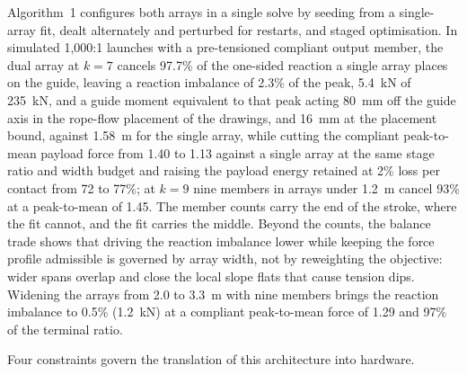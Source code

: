 \documentclass[preprint,12pt,number]{elsarticle}
\newcommand{\ptm}{peak-to-mean}
\begin{document}
Algorithm~1 configures both arrays in a single solve by seeding from a single-array fit, dealt alternately and perturbed for restarts, and staged optimisation. In simulated 1,000:1 launches with a pre-tensioned compliant output member, the dual array at $k=7$ cancels 97.7\% of the one-sided reaction a single array places on the guide, leaving a reaction imbalance of 2.3\% of the peak, 5.4~kN of 235~kN, and a guide moment equivalent to that peak acting 80~mm off the guide axis in the rope-flow placement of the drawings, and 16~mm at the placement bound, against 1.58~m for the single array, while cutting the compliant \ptm{} payload force from 1.40 to 1.13 against a single array at the same stage ratio and width budget and raising the payload energy retained at 2\% loss per contact from 72 to 77\%; at $k=9$ nine members in arrays under 1.2~m cancel 93\% at a \ptm{} of 1.45. The member counts carry the end of the stroke, where the fit cannot, and the fit carries the middle. Beyond the counts, the balance trade shows that driving the reaction imbalance lower while keeping the force profile admissible is governed by array width, not by reweighting the objective: wider spans overlap and close the local slope flats that cause tension dips. Widening the arrays from 2.0 to 3.3~m with nine members brings the reaction imbalance to 0.5\% (1.2~kN) at a compliant \ptm{} force of 1.29 and 97\% of the terminal ratio.

Four constraints govern the translation of this architecture into hardware.
\end{document}
